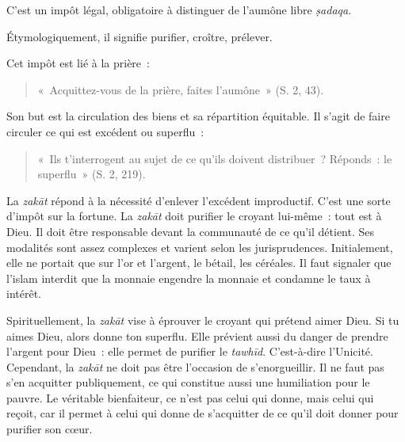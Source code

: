 



C'est un impôt légal, obligatoire à distinguer de l'aumône libre
\emph{ṣadaqa}.

Étymologiquement, il signifie purifier, croître, prélever.

Cet impôt est lié à la prière~: 
\begin{quote}
    
«~Acquittez-vous de la prière, faites
l'aumône~» (S. 2, 43).
\end{quote}

Son but est la circulation des biens et sa répartition équitable. Il
s'agit de faire circuler ce qui est excédent ou superflu~:

\begin{quote}
«~Ils t'interrogent au sujet de ce qu'ils doivent distribuer~? Réponds~:
le superflu~» (S. 2, 219).
\end{quote}

La \emph{zakāt} répond à la nécessité d'enlever l'excédent improductif.
C'est une sorte d'impôt sur la fortune. La \emph{zakāt} doit purifier le
croyant lui-même~: tout est à Dieu. Il doit être responsable devant la
communauté de ce qu'il détient. Ses modalités sont assez complexes et
varient selon les jurisprudences. Initialement, elle ne portait que sur
l'or et l'argent, le bétail, les céréales. Il faut signaler que l'islam
interdit que la monnaie engendre la monnaie et condamne le taux à
intérêt.

Spirituellement, la \emph{zakāt} vise à éprouver le croyant qui prétend
aimer Dieu. Si tu aimes Dieu, alors donne ton superflu. Elle prévient
aussi du danger de prendre l'argent pour Dieu~: elle permet de purifier
le \emph{tawhīd}. C'est-à-dire l'Unicité. Cependant, la \emph{zakāt} ne
doit pas être l'occasion de s'enorgueillir. Il ne faut pas s'en
acquitter publiquement, ce qui constitue aussi une humiliation pour le
pauvre. Le véritable bienfaiteur, ce n'est pas celui qui donne, mais
celui qui reçoit, car il permet à celui qui donne de s'acquitter de ce
qu'il doit donner pour purifier son cœur.

